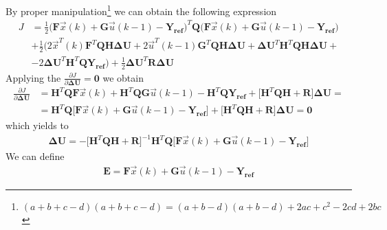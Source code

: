 \documentclass[12pt,a4paper,oneside]{book}
\begin{document}
\begin{onehalfspace}
By proper manipulation\footnote{$(a+b+c-d)(a+b+c-d) = 
(a+b-d)(a+b-d)+2ac+c^2-2cd+2bc$} we can obtain the following expression
\begin{equation}\label{eq21}
	\begin{aligned}
		J &= \frac{1}{2}\Big( \mathbf{F}\vec{x}(k)+\mathbf{G}\vec{u}(k-1) - 
		\mathbf{Y_{ref}}\Big) ^T\mathbf{Q}\Big( 
		\mathbf{F}\vec{x}(k)+\mathbf{G}\vec{u}(k-1) - \mathbf{Y_{ref}}\Big) 
		\\[6pt]
		&+ \frac{1}{2} \Big( 
		2\vec{x}^T(k)\mathbf{F}^T\mathbf{Q}\mathbf{H}\mathbf{\Delta U} + 
		2\vec{u}^T(k-1)\mathbf{G}^T\mathbf{Q}\mathbf{H}\mathbf{\Delta U} + 
		\mathbf{\Delta U}^T\mathbf{H}^T\mathbf{Q}\mathbf{H}\mathbf{\Delta U} + 
		\\[6pt]
		& - 2\mathbf{\Delta U}^T\mathbf{H}^T\mathbf{Q}\mathbf{Y_{ref}}\Big) + 
		\frac{1}{2} \mathbf{\Delta U}^T\mathbf{R}\mathbf{\Delta U}
	\end{aligned}
\end{equation}
Applying the $\frac{\partial J}{\partial \mathbf{\Delta U}} = \mathbf{0}$ we 
obtain
\begin{equation}\label{eq22}
	\begin{aligned}
		\frac{\partial J}{\partial  \mathbf{\Delta U}} &= 
		\mathbf{H}^T\mathbf{Q}\mathbf{F}\vec{x}(k)+\mathbf{H}^T\mathbf{Q}\mathbf{G}\vec{u}(k-1)-\mathbf{H}^T\mathbf{Q}\mathbf{Y_{ref}}+\Big[\mathbf{H}^T\mathbf{Q}\mathbf{H}
		 + \mathbf{R}\Big]\mathbf{\Delta U} = \\[6pt]
		& = \mathbf{H}^T\mathbf{Q}\Big[\mathbf{F}\vec{x}(k)+ 
		\mathbf{G}\vec{u}(k-1) - \mathbf{Y_{ref}}\Big] 
		+\Big[\mathbf{H}^T\mathbf{Q}\mathbf{H} + \mathbf{R}\Big]\mathbf{\Delta 
		U} = \mathbf{0}
	\end{aligned}
\end{equation}
which yields to 
\begin{equation}\label{eq23}
	\begin{aligned}
		\mathbf{\Delta U} = - \Big[\mathbf{H}^T\mathbf{Q}\mathbf{H} + 
		\mathbf{R}\Big]^{-1} \mathbf{H}^T\mathbf{Q}\Big[\mathbf{F}\vec{x}(k)+ 
		\mathbf{G}\vec{u}(k-1) - \mathbf{Y_{ref}}\Big]
	\end{aligned}
\end{equation}
We can define 
\begin{equation}\label{eq24}
	\begin{aligned}
		\mathbf{E} = \mathbf{F}\vec{x}(k)+ \mathbf{G}\vec{u}(k-1) - 
		\mathbf{Y_{ref}}
	\end{aligned}
\end{equation}

\end{onehalfspace}
\end{document}
